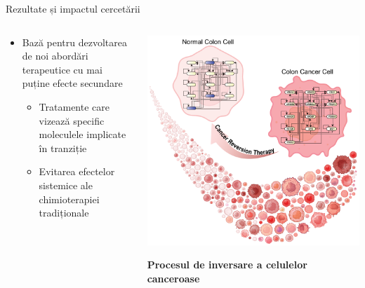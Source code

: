 \documentclass{beamer}
\begin{document}
\begin{frame}[allowframebreaks]{Rezultate și impactul cercetării}
		\begin{columns}
			\begin{column}{0.6\textwidth}
				\begin{itemize}
					\item Bază pentru dezvoltarea de noi abordări terapeutice cu mai puține efecte secundare
					\begin{itemize}
						\item Tratamente care vizează specific moleculele implicate în tranziție
						\item Evitarea efectelor sistemice ale chimioterapiei tradiționale
					\end{itemize}
				\end{itemize}
			\end{column}
			\begin{column}{0.4\textwidth}
				\begin{center}
					\includegraphics[width=\textwidth]{image2.png}
					
					\textbf{Procesul de inversare a celulelor canceroase}
				\end{center}
			\end{column}
		\end{columns}
	\end{frame}
\end{document}
